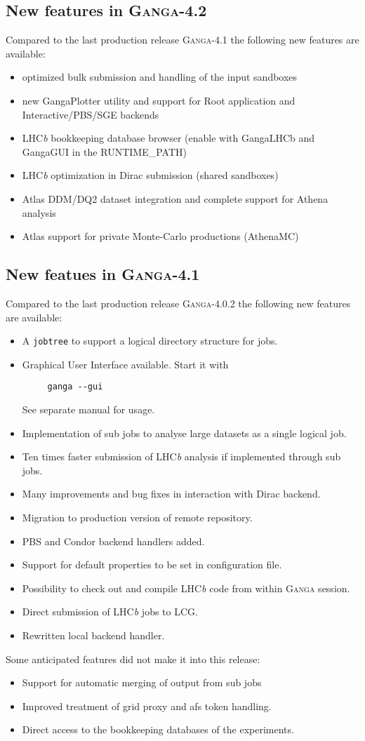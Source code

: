 \documentclass{howto}
\def\ganga {\textsc{Ganga}\xspace}
\def\lhcb {LHC{\em b\/}\xspace}
\begin{document}
\subsection{New features in \ganga-4.2}
Compared to the last production release \ganga-4.1 the following new features are available:
\begin{itemize}
\item optimized bulk submission and handling of the input sandboxes
\item new GangaPlotter utility and support for Root application and Interactive/PBS/SGE backends
\item \lhcb bookkeeping database browser (enable with GangaLHCb and GangaGUI in the RUNTIME_PATH)
\item \lhcb optimization in Dirac submission (shared sandboxes)
\item Atlas DDM/DQ2 dataset integration and complete support for Athena analysis
\item Atlas support for private Monte-Carlo productions (AthenaMC)
\end{itemize}

\subsection{New featues in \ganga-4.1}
Compared to the last production release \ganga-4.0.2 the following new
features are available:
\begin{itemize}
\item A \texttt{jobtree} to support a logical directory structure for jobs.
\item Graphical User Interface available. Start it with
\begin{verbatim}
     ganga --gui
\end{verbatim}
  See separate manual for usage.
\item Implementation of sub jobs to analyse large datasets as a single logical
  job.
\item Ten times faster submission of \lhcb analysis if implemented through sub
  jobs.
\item Many improvements and bug fixes in interaction with Dirac backend.
\item Migration to production version of remote repository.
\item PBS and Condor backend handlers added.
\item Support for default properties to be set in configuration file.
\item Possibility to check out and compile \lhcb code from within \ganga
  session.
\item Direct submission of \lhcb jobs to LCG.
\item Rewritten local backend handler.
\end{itemize}

Some anticipated features did not make it into this release:
\begin{itemize}
\item Support for automatic merging of output from sub jobs
\item Improved treatment of grid proxy and afs token handling.
\item Direct access to the bookkeeping databases of the experiments.
\end{itemize}
\end{document}

